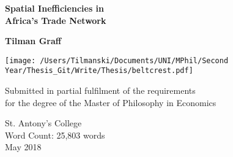 \documentclass[11pt, oneside]{article}   	%
\begin{document}

\begin{titlepage}
    \begin{center}
        \vspace*{0cm}

        \Huge
        \textbf{Spatial Inefficiencies in \\
        Africa's Trade Network}

        \vspace{0.5cm}


        \vspace{1.5cm}
        \LARGE
        \textbf{Tilman Graff}

        \vfill

        \texttt{[image: /Users/Tilmanski/Documents/UNI/MPhil/Second Year/Thesis\_Git/Write/Thesis/beltcrest.pdf]}

        \vfill
        \vspace{-1.5cm}
        \large
        Submitted in partial fulfilment of the requirements \\
        for the degree of the Master of Philosophy in Economics

        \vspace{0.8cm}



        \large
        St. Antony's College\\
        Word Count: 25,803 words\\ %
        May 2018

    \end{center}
\end{titlepage}

\newpage
\end{document}
